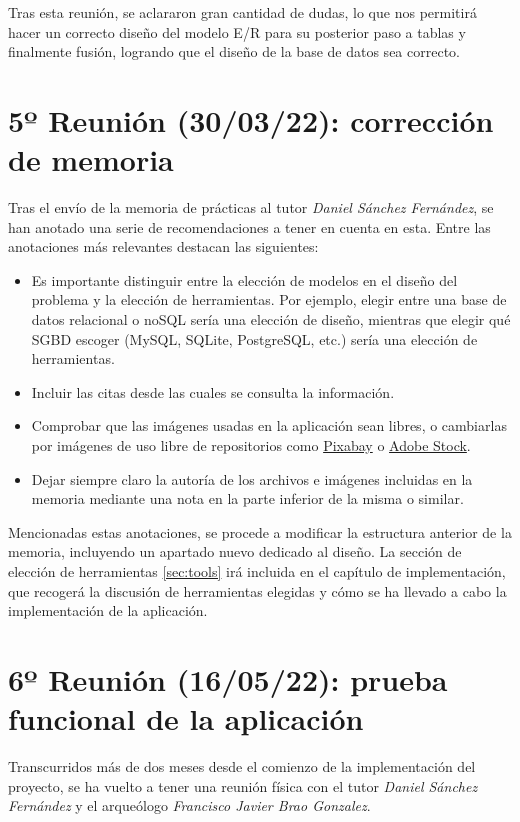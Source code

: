 Tras esta reunión, se aclararon gran cantidad de dudas, lo que nos permitirá hacer un
correcto diseño del modelo E/R para su posterior paso a tablas y finalmente fusión, logrando
que el diseño de la base de datos sea correcto.

\section{5º Reunión (30/03/22): corrección de memoria}
Tras el envío de la memoria de prácticas al tutor \textit{Daniel Sánchez Fernández}, se
han anotado una serie de recomendaciones a tener en cuenta en esta. Entre las anotaciones
más relevantes destacan las siguientes:

    \begin{itemize}
        \item Es importante distinguir entre la elección de modelos en el diseño del problema
        y la elección de herramientas. Por ejemplo, elegir entre una base de datos relacional
        o noSQL sería una elección de diseño, mientras que elegir qué SGBD escoger (MySQL,
        SQLite, PostgreSQL, etc.) sería una elección de herramientas.
        \item Incluir las citas desde las cuales se consulta la información.
        \item Comprobar que las imágenes usadas en la aplicación sean libres, o cambiarlas
        por imágenes de uso libre de repositorios como \href{https://pixabay.com/}{Pixabay} o
        \href{https://stock.adobe.com/es/}{Adobe Stock}.
        \item Dejar siempre claro la autoría de los archivos e imágenes incluidas en la
        memoria mediante una nota en la parte inferior de la misma o similar.
    \end{itemize}

Mencionadas estas anotaciones, se procede a modificar la estructura anterior de la memoria,
incluyendo un apartado nuevo dedicado al diseño. La sección de elección de herramientas
\ref{sec:tools} irá incluida en el capítulo de implementación, que recogerá la discusión de
herramientas elegidas y cómo se ha llevado a cabo la implementación de la aplicación.

\section{6º Reunión (16/05/22): prueba funcional de la aplicación}
Transcurridos más de dos meses desde el comienzo de la implementación del proyecto, se ha
vuelto a tener una reunión física con el tutor \textit{Daniel Sánchez Fernández} y el
arqueólogo \textit{Francisco Javier Brao Gonzalez}.\\

